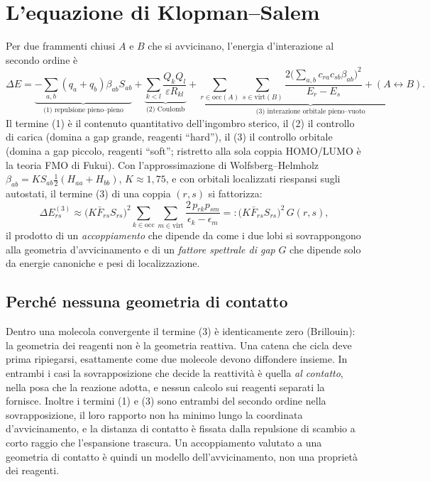 \documentclass[11pt,a4paper]{report}
\newcommand{\occ}{\mathrm{occ}}
\newcommand{\virt}{\mathrm{virt}}
\begin{document}
\section{L'equazione di Klopman--Salem}
Per due frammenti chiusi $A$ e $B$ che si avvicinano, l'energia d'interazione al secondo ordine è
\begin{equation}
\Delta E=\underbrace{-\sum_{a,b}(q_a+q_b)\beta_{ab}S_{ab}}_{\text{(1) repulsione pieno--pieno}}
+\underbrace{\sum_{k<l}\frac{Q_kQ_l}{\varepsilon R_{kl}}}_{\text{(2) Coulomb}}
+\underbrace{\sum_{r\in\occ(A)}\sum_{s\in\virt(B)}\frac{2\big(\sum_{a,b}c_{ra}c_{sb}\beta_{ab}\big)^2}{E_r-E_s}+(A\leftrightarrow B)}_{\text{(3) interazione orbitale pieno--vuoto}} .
\end{equation}
Il termine (1) è il contenuto quantitativo dell'ingombro sterico, il (2) il controllo di carica
(domina a gap grande, reagenti \enquote{hard}), il (3) il controllo orbitale (domina a gap piccolo,
reagenti \enquote{soft}; ristretto alla sola coppia HOMO/LUMO è la teoria FMO di Fukui).
Con l'approssimazione di Wolfsberg--Helmholz $\beta_{ab}=K S_{ab}\tfrac12(H_{aa}+H_{bb})$,
$K\approx1{,}75$, e con orbitali localizzati riespansi sugli autostati, il termine (3) di una coppia
$(r,s)$ si fattorizza:
\begin{equation}
\Delta E^{(3)}_{rs}\approx\big(K\bar F_{rs}S_{rs}\big)^2\sum_{k\in\occ}\sum_{m\in\virt}
\frac{2\,p_{rk}p_{sm}}{\epsilon_k-\epsilon_m}=:\big(K\bar F_{rs}S_{rs}\big)^2\,G(r,s),
\end{equation}
il prodotto di un \emph{accoppiamento} che dipende da come i due lobi si sovrappongono alla geometria
d'avvicinamento e di un \emph{fattore spettrale di gap} $G$ che dipende solo da energie canoniche e
pesi di localizzazione.

\subsection{Perché nessuna geometria di contatto}
Dentro una molecola convergente il termine (3) è identicamente zero (Brillouin): la geometria dei
reagenti non è la geometria reattiva. Una catena che cicla deve prima ripiegarsi, esattamente come due
molecole devono diffondere insieme. In entrambi i casi la sovrapposizione che decide la reattività è
quella \emph{al contatto}, nella posa che la reazione adotta, e nessun calcolo sui reagenti separati
la fornisce. Inoltre i termini (1) e (3) sono entrambi del secondo ordine nella sovrapposizione, il
loro rapporto non ha minimo lungo la coordinata d'avvicinamento, e la distanza di contatto è fissata
dalla repulsione di scambio a corto raggio che l'espansione trascura. Un accoppiamento valutato a una
geometria di contatto è quindi un modello dell'avvicinamento, non una proprietà dei reagenti.
\end{document}
